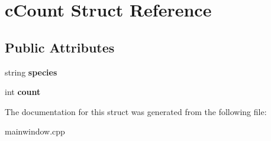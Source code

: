\hypertarget{structc_count}{}\section{c\+Count Struct Reference}
\label{structc_count}
\subsection*{Public Attributes}
\begin{DoxyCompactItemize}
\item 
\mbox{\label{structc_count_af46e3a4ba49475372b75648d783eadd4}} 
string {\bfseries species}
\item 
\mbox{\label{structc_count_a698745ae3c9758015a887cc57b641643}} 
int {\bfseries count}
\end{DoxyCompactItemize}


The documentation for this struct was generated from the following file\+:\begin{DoxyCompactItemize}
\item 
mainwindow.\+cpp\end{DoxyCompactItemize}
